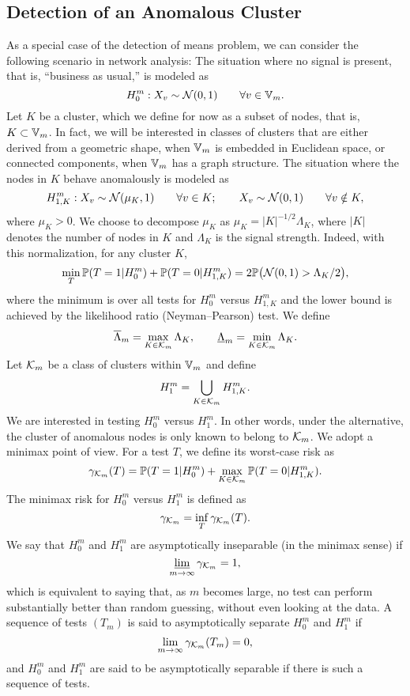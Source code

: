 \documentclass[10pt, oneside]{article}
\begin{document}
\subsection{Detection of an Anomalous Cluster}
As a special case of the detection of means problem, we can consider the following scenario in network analysis:
The situation where no signal is present, that is, ``business as
usual,'' is modeled as
%
\[
H_0^m : X_v \sim{\mathcal N}(0,1)\qquad \forall v \in\mathbb V_m.
\]
%
Let $K$ be a cluster, which we define for now as a subset of nodes,
that is, \mbox{$K \subset\mathbb V_m$}. In fact, we will be interested in classes of
clusters that are either derived from a geometric shape, when $\mathbb V_m$ is
embedded in Euclidean space, or connected components, when $\mathbb V_m$ has a
graph structure.
The situation where the nodes in $K$ behave anomalously is modeled as
%
\[
H_{1,K}^m : X_v \sim{\mathcal N}(\mu_K,1)\qquad \forall v \in K;\qquad X_v \sim
{\mathcal N}(0,1)\qquad \forall v \notin K,
\]
%
where $\mu_K > 0$.
We choose to decompose $\mu_K$ as $\mu_K = |K|^{-1/2} \Lambda_K$, where
$|K|$ denotes the number of nodes in $K$ and $\Lambda_K$ is the signal
strength. Indeed, with this normalization, for any cluster $K$,
%
%
\begin{equation} \label{eq:simple-risk}
\min_T \mathbb{P}(T = 1|H_0^m) + \mathbb{P}(T = 0|H_{1,K}^m) = 2 \mathbb{P}\bigl({\mathcal N}
(0,1) >
\Lambda_K/2\bigr),
\end{equation}
%
where the minimum is over all tests for $H_0^m$ versus $H
_{1,K}^m$ and the lower bound is achieved by the likelihood ratio
(Neyman--Pearson) test. We define
%
\[
\overline{\Lambda}_m = \max_{K \in{\mathcal K}_m} \Lambda_K,\qquad \underline{\Lambda}_m =
\min_{K
\in{\mathcal K}_m} \Lambda_K.
\]
Let ${\mathcal K}_m$ be a class of clusters within $\mathbb V_m$ and define
%
\[
H_1^m = \bigcup_{K \in{\mathcal K}_m} H_{1,K}^m.
\]
%
We are interested in testing $H_0^m$ versus $H_1^m$. In other
words, under the alternative, the cluster of anomalous nodes is only
known to belong to ${\mathcal K}_m$.
We adopt a minimax point of view.
For a test $T$, we define its worst-case risk as
%
\[
\gamma_{{\mathcal K}_m}(T) = \mathbb{P}(T = 1|H_0^m) + \max_{K \in{\mathcal K}_m} \mathbb{P}(T =
0|H_{1,K}^m).
\]
%
The minimax risk for $H_0^m$ versus $H_1^m$ is defined as
%
\[
\gamma_{{\mathcal K}_m} = \inf_T \gamma_{{\mathcal K}_m}(T).
\]
%
We say that $H_0^m$ and $H_1^m$ are asymptotically inseparable
(in the minimax sense) if
%
\[
\varliminf_{m \to\infty} \gamma_{{\mathcal K}_m} = 1,
\]
%
which is equivalent to saying that, as $m$ becomes large, no test can
perform substantially better than random guessing, without even looking
at the data.
A sequence of tests $(T_m)$ is said to asymptotically separate $H
_0^m$ and $H_1^m$ if
%
\[
\lim_{m \to\infty} \gamma_{{\mathcal K}_m}(T_m) = 0,
\]
%
and $H_0^m$ and $H_1^m$ are said to be asymptotically separable
if there is such a sequence of tests.
\end{document}
